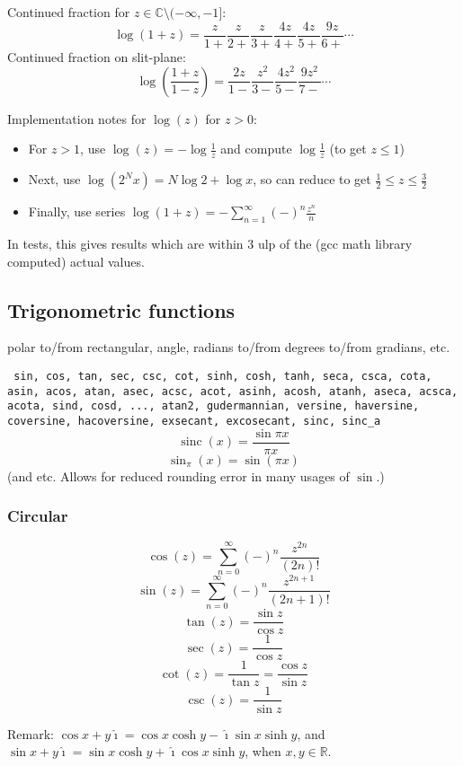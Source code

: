 \documentclass[10pt,dvipdfmx,letterpaper,twoside]{article}
\let\O=\operatorname
\newcommand{\RR}{{\mathbb{R}}}
\newcommand{\CC}{{\mathbb{C}}}
\newcommand{\ii}{{\hat{\imath}}}
\newenvironment{implementation}{\noindent\begin{framed}}{\end{framed}}
\begin{document}
Continued fraction for $z\in\CC\setminus(-\infty,-1]$:
\[ \log(1+z) = \frac{z}{1+} \frac{z}{2+} \frac{z}{3+} \frac{4z}{4+} \frac{4z}{5+} \frac{9z}{6+} \cdots \]
Continued fraction on slit-plane:
\[ \log(\frac{1+z}{1-z}) = \frac{2z}{1-} \frac{z^2}{3-} \frac{4z^2}{5-} \frac{9z^2}{7-} \cdots \]

\begin{implementation}
Implementation notes for $\log(z)$ for $z>0$:
\begin{itemize}
\item For $z>1$, use $\log(z) = -\log\frac1z$ and compute $\log\frac1z$ (to get $z\leq1$)
\item Next, use $\log(2^N x) = N\log 2 + \log x$, so can reduce to get $\tfrac12\leq z\leq\tfrac32$
\item Finally, use series $\log(1+z) = -\sum_{n=1}^\infty(-)^n\frac{z^n}{n}$
\end{itemize}
In tests, this gives results which are within 3 ulp of the (gcc math library computed) actual values.
\end{implementation}

\subsection{Trigonometric functions}

polar to/from rectangular, angle, radians to/from degrees to/from gradians, etc.

{\tt
sin, cos, tan, sec, csc, cot,
sinh, cosh, tanh, seca, csca, cota,
asin, acos, atan, asec, acsc, acot,
asinh, acosh, atanh, aseca, acsca, acota,
sind, cosd, ..., atan2, gudermannian,
versine, haversine, coversine, hacoversine, exsecant, excosecant,
sinc, sinc\_a}
\[ \O{sinc}(x) = \frac{\sin \pi x}{\pi x} \]
\[ \O{sin}_\pi(x) = \sin(\pi x) \]
(and etc.  Allows for reduced rounding error in many usages of $\sin$.)

\subsubsection{Circular}
\[ \cos(z) = \sum_{n=0}^\infty (-)^n\frac{z^{2n}}{(2n)!} \]
\[ \sin(z) = \sum_{n=0}^\infty (-)^n\frac{z^{2n+1}}{(2n+1)!} \]
\[ \tan(z) = \frac{\sin z}{\cos z} \]
\[ \sec(z) = \frac{1}{\cos z} \]
\[ \cot(z) = \frac{1}{\tan z} = \frac{\cos z}{\sin z} \]
\[ \csc(z) = \frac{1}{\sin z} \]

Remark: $\cos x+y\ii = \cos x \cosh y - \ii \sin x \sinh y$, and 
$\sin x+y\ii = \sin x \cosh y + \ii \cos x \sinh y$, when $x,y\in\RR$.
\end{document}

